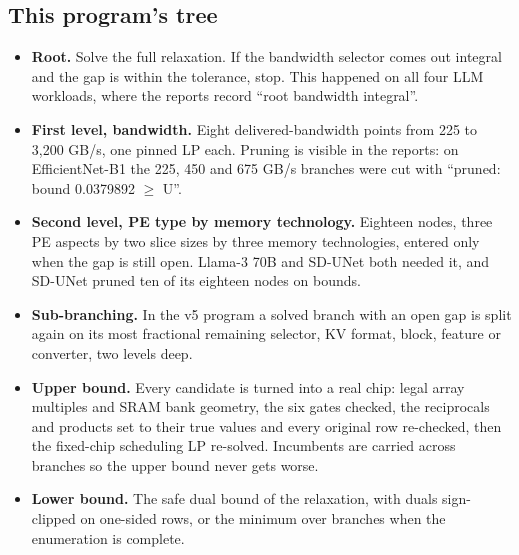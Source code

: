 \documentclass[10pt]{article}
\newenvironment{tight}
  {\begin{itemize}[leftmargin=13pt,itemsep=4pt,topsep=4pt,parsep=0pt,
     label=\textcolor{ink3}{\footnotesize$\bullet$}]\color{ink2}}
  {\end{itemize}}
\begin{document}
\subsection{This program's tree}
\begin{tight}
\item \textbf{\color{ink}Root.} Solve the full relaxation. If the bandwidth
selector comes out integral and the gap is within the tolerance, stop. This
happened on all four LLM workloads, where the reports record ``root bandwidth
integral''.
\item \textbf{\color{ink}First level, bandwidth.} Eight delivered-bandwidth
points from 225 to 3,200 GB/s, one pinned LP each. Pruning is visible in the
reports: on EfficientNet-B1 the 225, 450 and 675 GB/s branches were cut with
``pruned: bound 0.0379892 $\ge$ U''.
\item \textbf{\color{ink}Second level, PE type by memory technology.} Eighteen
nodes, three PE aspects by two slice sizes by three memory technologies,
entered only when the gap is still open. Llama-3 70B and SD-UNet both needed
it, and SD-UNet pruned ten of its eighteen nodes on bounds.
\item \textbf{\color{ink}Sub-branching.} In the v5 program a solved branch with
an open gap is split again on its most fractional remaining selector, KV
format, block, feature or converter, two levels deep.
\item \textbf{\color{ink}Upper bound.} Every candidate is turned into a real
chip: legal array multiples and SRAM bank geometry, the six gates checked, the
reciprocals and products set to their true values and every original row
re-checked, then the fixed-chip scheduling LP re-solved. Incumbents are carried
across branches so the upper bound never gets worse.
\item \textbf{\color{ink}Lower bound.} The safe dual bound of the relaxation,
with duals sign-clipped on one-sided rows, or the minimum over branches when
the enumeration is complete.
\end{tight}
\end{document}
